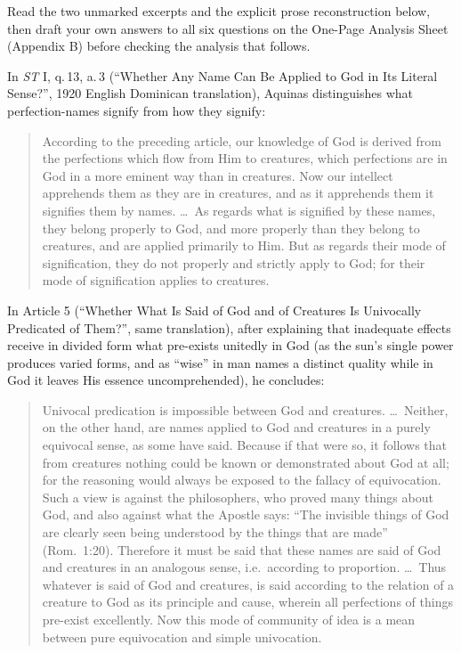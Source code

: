 Read the two unmarked excerpts and the explicit prose reconstruction below, then draft your own answers to all six questions on the One-Page Analysis Sheet (Appendix B) before checking the analysis that follows.

In \emph{ST} I, q.\,13, a.\,3 (``Whether Any Name Can Be Applied to God in Its Literal Sense?'', 1920 English Dominican translation), Aquinas distinguishes what perfection-names signify from how they signify:

\begin{quote}
According to the preceding article, our knowledge of God is derived from the perfections which flow from Him to creatures, which perfections are in God in a more eminent way than in creatures. Now our intellect apprehends them as they are in creatures, and as it apprehends them it signifies them by names. \dots\ As regards what is signified by these names, they belong properly to God, and more properly than they belong to creatures, and are applied primarily to Him. But as regards their mode of signification, they do not properly and strictly apply to God; for their mode of signification applies to creatures.
\end{quote}

In Article 5 (``Whether What Is Said of God and of Creatures Is Univocally Predicated of Them?'', same translation), after explaining that inadequate effects receive in divided form what pre-exists unitedly in God (as the sun's single power produces varied forms, and as ``wise'' in man names a distinct quality while in God it leaves His essence uncomprehended), he concludes:

\begin{quote}
Univocal predication is impossible between God and creatures. \dots\ Neither, on the other hand, are names applied to God and creatures in a purely equivocal sense, as some have said. Because if that were so, it follows that from creatures nothing could be known or demonstrated about God at all; for the reasoning would always be exposed to the fallacy of equivocation. Such a view is against the philosophers, who proved many things about God, and also against what the Apostle says: ``The invisible things of God are clearly seen being understood by the things that are made'' (Rom.\ 1:20). Therefore it must be said that these names are said of God and creatures in an analogous sense, i.e.\ according to proportion. \dots\ Thus whatever is said of God and creatures, is said according to the relation of a creature to God as its principle and cause, wherein all perfections of things pre-exist excellently. Now this mode of community of idea is a mean between pure equivocation and simple univocation.
\end{quote}

